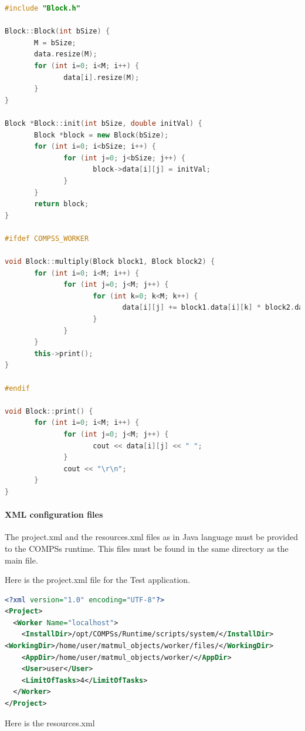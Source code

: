 \begin{lstlisting}[language=C++]
#include "Block.h"

Block::Block(int bSize) {
       M = bSize;
       data.resize(M);
       for (int i=0; i<M; i++) {
              data[i].resize(M);
       }
}

Block *Block::init(int bSize, double initVal) {
       Block *block = new Block(bSize);
       for (int i=0; i<bSize; i++) {
              for (int j=0; j<bSize; j++) {
                     block->data[i][j] = initVal;
              }
       }
       return block;
}

#ifdef COMPSS_WORKER

void Block::multiply(Block block1, Block block2) {
       for (int i=0; i<M; i++) {
              for (int j=0; j<M; j++) {
                     for (int k=0; k<M; k++) {
                            data[i][j] += block1.data[i][k] * block2.data[k][j];
                     }
              }
       }
       this->print();
}

#endif

void Block::print() {
       for (int i=0; i<M; i++) {
              for (int j=0; j<M; j++) {
                     cout << data[i][j] << " ";
              }
              cout << "\r\n";
       }
}
\end{lstlisting}

\paragraph{XML configuration files}
The project.xml and the resources.xml files as in Java language must be provided to the COMPSs runtime. This files must be found in the same directory as the main file.

Here is the project.xml file for the Test application.

\begin{lstlisting}[language=xml] 
<?xml version="1.0" encoding="UTF-8"?>
<Project>
  <Worker Name="localhost">
    <InstallDir>/opt/COMPSs/Runtime/scripts/system/</InstallDir>
<WorkingDir>/home/user/matmul_objects/worker/files/</WorkingDir>
    <AppDir>/home/user/matmul_objects/worker/</AppDir>
    <User>user</User>
    <LimitOfTasks>4</LimitOfTasks>
  </Worker>
</Project>
\end{lstlisting}

Here is the resources.xml

